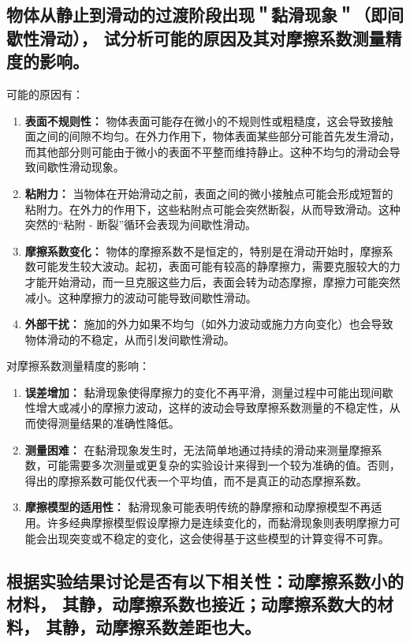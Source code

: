 \subsection{物体从静止到滑动的过渡阶段出现＂黏滑现象＂（即间歇性滑动），
试分析可能的原因及其对摩擦系数测量精度的影响。}
可能的原因有：
\begin{enumerate}
    \item \textbf{表面不规则性：} 物体表面可能存在微小的不规则性或粗糙度，这会导致接触面之间的间隙不均匀。在外力作用下，物体表面某些部分可能首先发生滑动，而其他部分则可能由于微小的表面不平整而维持静止。这种不均匀的滑动会导致间歇性滑动现象。
    
    \item \textbf{粘附力：} 当物体在开始滑动之前，表面之间的微小接触点可能会形成短暂的粘附力。在外力的作用下，这些粘附点可能会突然断裂，从而导致滑动。这种突然的“粘附 - 断裂”循环会表现为间歇性滑动。
    
    \item \textbf{摩擦系数变化：} 物体的摩擦系数不是恒定的，特别是在滑动开始时，摩擦系数可能发生较大波动。起初，表面可能有较高的静摩擦力，需要克服较大的力才能开始滑动，而一旦克服这些力后，表面会转为动态摩擦，摩擦力可能突然减小。这种摩擦力的波动可能导致间歇性滑动。
    
    \item \textbf{外部干扰：} 施加的外力如果不均匀（如外力波动或施力方向变化）也会导致物体滑动的不稳定，从而引发间歇性滑动。
\end{enumerate}

对摩擦系数测量精度的影响：
\begin{enumerate}
    \item \textbf{误差增加：} 黏滑现象使得摩擦力的变化不再平滑，测量过程中可能出现间歇性增大或减小的摩擦力波动，这样的波动会导致摩擦系数测量的不稳定性，从而使得测量结果的准确性降低。
    
    \item \textbf{测量困难：} 在黏滑现象发生时，无法简单地通过持续的滑动来测量摩擦系数，可能需要多次测量或更复杂的实验设计来得到一个较为准确的值。否则，得出的摩擦系数可能仅代表一个平均值，而不是真正的动态摩擦系数。
    
    \item \textbf{摩擦模型的适用性：} 黏滑现象可能表明传统的静摩擦和动摩擦模型不再适用。许多经典摩擦模型假设摩擦力是连续变化的，而黏滑现象则表明摩擦力可能会出现突变或不稳定的变化，这会使得基于这些模型的计算变得不可靠。
\end{enumerate}


\subsection{根据实验结果讨论是否有以下相关性：动摩擦系数小的材料，
其静，动摩擦系数也接近；动摩擦系数大的材料，
其静，动摩擦系数差距也大。}

